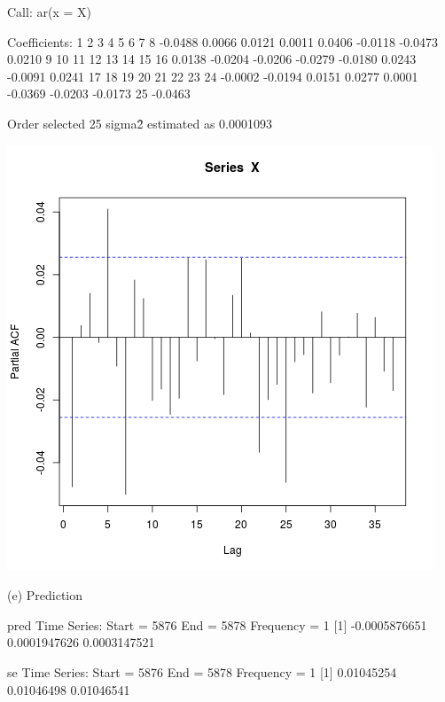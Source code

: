 \documentclass{article}
\begin{document}
Call:
ar(x = X)

Coefficients:
      1        2        3        4        5        6        7        8  
-0.0488   0.0066   0.0121   0.0011   0.0406  -0.0118  -0.0473   0.0210  
      9       10       11       12       13       14       15       16  
 0.0138  -0.0204  -0.0206  -0.0279  -0.0180   0.0243  -0.0091   0.0241  
     17       18       19       20       21       22       23       24  
-0.0002  -0.0194   0.0151   0.0277   0.0001  -0.0369  -0.0203  -0.0173  
     25  
-0.0463

Order selected 25  sigma\^2 estimated as  0.0001093

\includegraphics{"plot1_d"}
\pagebreak

(e)
Prediction

pred
Time Series:
Start = 5876 
End = 5878 
Frequency = 1 
[1] -0.0005876651  0.0001947626  0.0003147521

se
Time Series:
Start = 5876 
End = 5878 
Frequency = 1 
[1] 0.01045254 0.01046498 0.01046541
\end{document}
